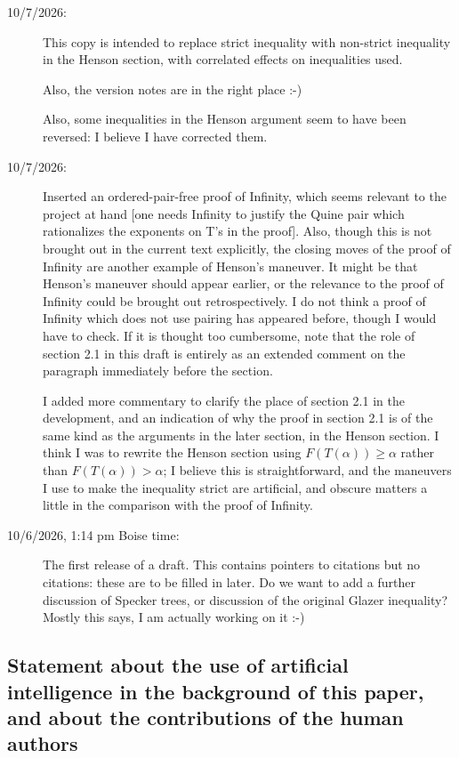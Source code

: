 \documentclass[12pt]{article}
\begin{document}
\begin{description}
\item[10/7/2026:]  This copy is intended to replace strict inequality with non-strict inequality in the Henson section, with correlated effects on inequalities used.

Also, the version notes are in the right place :-)

Also, some inequalities in the Henson argument seem to have been reversed:  I believe I have corrected them.

\item[10/7/2026:]  Inserted an ordered-pair-free proof of Infinity, which seems relevant to the project at hand [one needs Infinity to justify the Quine pair which rationalizes the exponents on T's in the proof].
Also, though this is not brought out in the current text explicitly, the closing moves of the proof of Infinity are another example of Henson's maneuver.  It might be that Henson's maneuver should appear earlier,
or the relevance to the proof of Infinity could be brought out retrospectively.  I do not think a proof of Infinity which does not use pairing has appeared before, though I would have to check.  If it is thought too cumbersome, note that the role of section 2.1 in this draft is entirely as an extended comment on the paragraph immediately before the section.

I added more commentary to clarify the place of section 2.1 in the development, and an indication of why the proof in section 2.1 is of the same kind as the arguments in the later section, in the Henson section.  I think I was to rewrite the Henson section using $F(T(\alpha)) \geq \alpha$ rather than $F(T(\alpha)) > \alpha$;  I believe this is straightforward, and the maneuvers I use to make the inequality strict are artificial, and obscure matters a little in the comparison with the proof of Infinity.

\item[10/6/2026, 1:14 pm Boise time:]  The first release of a draft.  This contains pointers to citations but no citations:  these are to be filled in later.  Do we want to add a further discussion of Specker trees, or
discussion of the original Glazer inequality?  Mostly this says, I am actually working on it :-)



\end{description}

\subsection{Statement about the use of artificial intelligence in the background of this paper, and about the contributions of the human authors}
\end{document}
